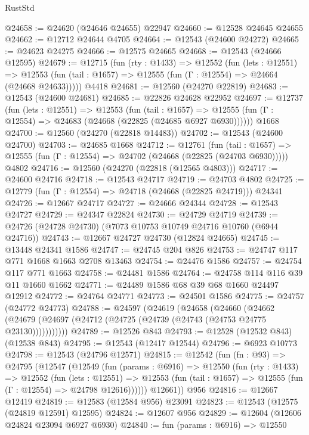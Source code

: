 \begin{lexlean}{RustStd}
\begin{coremodule}
@24658 := @24620 (@24646 @24655) @22947
@24660 := @12528 @24645 @24655
@24662 := @12712 @24644 @4705
@24664 := @12543 (@24600 @24272)
@24665 := @24623 @24275
@24666 := @12575 @24665
@24668 := @12543 (@24666 @12595)
@24679 := @12715
    (fun (rty : @1433) =>
    @12552
      (fun (lets : @12551) =>
      @12553 (fun (tail : @1657) => @12555 (fun (Γ : @12554) => @24664 (@24668 @24633)))))
    @4418
@24681 := @12560 (@24270 @22819)
@24683 := @12543 (@24600 @24681)
@24685 := @22826 @24628 @22952
@24697 := @12737
    (fun (lets : @12551) =>
    @12553
      (fun (tail : @1657) =>
      @12555 (fun (Γ : @12554) => @24683 (@24668 (@22825 (@24685 @6927 @6930))))))
    @1668
@24700 := @12560 (@24270 (@22818 @14483))
@24702 := @12543 (@24600 @24700)
@24703 := @24685 @1668
@24712 := @12761
    (fun (tail : @1657) => @12555 (fun (Γ : @12554) => @24702 (@24668 (@22825 (@24703 @6930)))))
    @4802
@24716 := @12560 (@24270 (@22818 (@12565 @4803)))
@24717 := @24600 @24716
@24718 := @12543 @24717
@24719 := @24703 @4802
@24725 := @12779 (fun (Γ : @12554) => @24718 (@24668 (@22825 @24719))) @24341
@24726 := @12667 @24717
@24727 := @24666 @24344
@24728 := @12543 @24727
@24729 := @24347 @22824
@24730 := @24729 @24719
@24739 := @24726 (@24728 @24730) (@7073 @10753 @10749 @24716 @10760 (@6944 @24716))
@24743 := @12667 @24727 @24730 (@12824 @24665)
@24745 := @13448 @24341 @1586
@24747 := @24745 @204 @826
@24753 := @24747 @117 @771 @1668 @1663 @2708 @13463
@24754 := @24476 @1586
@24757 := @24754 @117 @771 @1663
@24758 := @24481 @1586
@24764 := @24758 @114 @116 @39 @11 @1660 @1662
@24771 := @24489 @1586 @68 @39 @68 @1660 @24497 @12912
@24772 := @24764 @24771
@24773 := @24501 @1586
@24775 := @24757 (@24772 @24773)
@24788 := @24597
    (@24619
      (@24658
        (@24660
          (@24662 (@24679 (@24697 (@24712 (@24725 (@24739 (@24743 (@24753 @24775 @23130)))))))))))
@24789 := @12526 @843
@24793 := @12528 (@12532 @843) (@12538 @843)
@24795 := @12543 (@12417 @12544)
@24796 := @6923 @10773
@24798 := @12543 (@24796 @12571)
@24815 := @12542
    (fun (fn : @93) =>
    @24795
      (@12547
        (@12549
          (fun (params : @6916) =>
          @12550
            (fun (rty : @1433) =>
            @12552
              (fun (lets : @12551) =>
              @12553 (fun (tail : @1657) => @12555 (fun (Γ : @12554) => @24798 @12616))))))
        @12661))
    @956
@24816 := @12667 @12419
@24819 := @12583 (@12584 @956) @23091
@24823 := @12543 (@12575 (@24819 @12591) @12595)
@24824 := @12607 @956
@24829 := @12604 (@12606 @24824 @23094 @6927 @6930)
@24840 := fun (params : @6916) =>
  @12550

\end{coremodule}
\end{lexlean}
